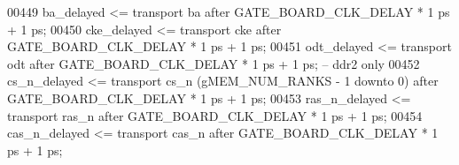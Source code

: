 \begin{DoxyCode}
00449     \textcolor{vhdlchar}{ba_delayed}      \textcolor{vhdlchar}{<=}   \textcolor{keywordflow}{transport} \textcolor{vhdlchar}{ba}     \textcolor{keywordflow}{after} \textcolor{vhdlchar}{GATE_BOARD_CLK_DELAY} \textcolor{vhdlchar}{*} \textcolor{vhdllogic}{}\textcolor{vhdllogic}{1} \textcolor{vhdlchar}{ps} \textcolor{vhdlchar}{+} \textcolor{vhdllogic}{}\textcolor{vhdllogic}{1} \textcolor{vhdlchar}{ps};
00450     \textcolor{vhdlchar}{cke_delayed}     \textcolor{vhdlchar}{<=}   \textcolor{keywordflow}{transport} \textcolor{vhdlchar}{cke}    \textcolor{keywordflow}{after} \textcolor{vhdlchar}{GATE_BOARD_CLK_DELAY} \textcolor{vhdlchar}{*} \textcolor{vhdllogic}{}\textcolor{vhdllogic}{1} \textcolor{vhdlchar}{ps} \textcolor{vhdlchar}{+} \textcolor{vhdllogic}{}\textcolor{vhdllogic}{1} \textcolor{vhdlchar}{ps};
00451     \textcolor{vhdlchar}{odt_delayed}     \textcolor{vhdlchar}{<=}   \textcolor{keywordflow}{transport} \textcolor{vhdlchar}{odt}    \textcolor{keywordflow}{after} \textcolor{vhdlchar}{GATE_BOARD_CLK_DELAY} \textcolor{vhdlchar}{*} \textcolor{vhdllogic}{}\textcolor{vhdllogic}{1} \textcolor{vhdlchar}{ps} \textcolor{vhdlchar}{+} \textcolor{vhdllogic}{}\textcolor{vhdllogic}{1} \textcolor{vhdlchar}{ps};\textcolor{keyword}{  -- ddr2 only}
00452     \textcolor{vhdlchar}{cs_n_delayed}    \textcolor{vhdlchar}{<=}   \textcolor{keywordflow}{transport} \textcolor{vhdlchar}{cs_n} \textcolor{vhdlchar}{(}\textcolor{vhdlchar}{gMEM_NUM_RANKS} \textcolor{vhdlchar}{-} \textcolor{vhdllogic}{}\textcolor{vhdllogic}{1} \textcolor{keywordflow}{downto} \textcolor{vhdllogic}{}\textcolor{vhdllogic}{0}\textcolor{vhdlchar}{)}  \textcolor{keywordflow}{after} \textcolor{vhdlchar}{
      GATE_BOARD_CLK_DELAY} \textcolor{vhdlchar}{*} \textcolor{vhdllogic}{}\textcolor{vhdllogic}{1} \textcolor{vhdlchar}{ps} \textcolor{vhdlchar}{+} \textcolor{vhdllogic}{}\textcolor{vhdllogic}{1} \textcolor{vhdlchar}{ps};
00453     \textcolor{vhdlchar}{ras_n_delayed}   \textcolor{vhdlchar}{<=}   \textcolor{keywordflow}{transport} \textcolor{vhdlchar}{ras_n}  \textcolor{keywordflow}{after} \textcolor{vhdlchar}{GATE_BOARD_CLK_DELAY} \textcolor{vhdlchar}{*} \textcolor{vhdllogic}{}\textcolor{vhdllogic}{1} \textcolor{vhdlchar}{ps} \textcolor{vhdlchar}{+} \textcolor{vhdllogic}{}\textcolor{vhdllogic}{1} \textcolor{vhdlchar}{ps};
00454     \textcolor{vhdlchar}{cas_n_delayed}   \textcolor{vhdlchar}{<=}   \textcolor{keywordflow}{transport} \textcolor{vhdlchar}{cas_n}  \textcolor{keywordflow}{after} \textcolor{vhdlchar}{GATE_BOARD_CLK_DELAY} \textcolor{vhdlchar}{*} \textcolor{vhdllogic}{}\textcolor{vhdllogic}{1} \textcolor{vhdlchar}{ps} \textcolor{vhdlchar}{+} \textcolor{vhdllogic}{}\textcolor{vhdllogic}{1} \textcolor{vhdlchar}{ps};

\end{DoxyCode}
